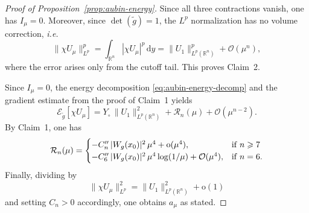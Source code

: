\documentclass[reqno,11pt]{amsart}
\numberwithin{equation}{section}
\theoremstyle{definition}
\theoremstyle{remark}
\newcommand{\ud}{\,\mathrm{d}}
\newcommand{\R}{\mathbb{R}}
\begin{document}
\begin{proof}[Proof of Proposition~\ref{prop:aubin-energy}]
Since all three contractions vanish, one has $I_\mu = 0$. Moreover, since $\det(\tilde{g}) = 1$, the $L^p$ normalization has no volume correction, {\it i.e.}
\[
\|\chi U_\mu\|_{L^p}^p = \int_{\R^n} |\chi U_\mu|^p \ud y = \|U_1\|_{L^p(\R^n)}^p + \mathcal{O}(\mu^n),
\]
where the error arises only from the cutoff tail. This proves Claim~2.

\medskip
Since $I_\mu = 0$, the energy decomposition \eqref{eq:aubin-energy-decomp} and the gradient estimate from the proof of Claim~1 yields
\[
\mathcal{E}_{\tilde{g}}[\chi U_\mu] = Y_\circ\,\|U_1\|_{L^p(\R^n)}^2 + \mathcal{R}_n(\mu) + \mathcal{O}(\mu^{n-2}).
\]
By Claim~1, one has
\[
\mathcal{R}_n(\mu)=
\begin{cases}
  -C_n''\,|W_g(x_0)|^2\,\mu^4 + \mathrm{o}(\mu^4), &{\rm if} \; n \geqslant 7\\
  -C_6''\,|W_g(x_0)|^2\,\mu^4\log(1/\mu) + \mathcal{O}(\mu^4), &{\rm if} \; n = 6.
\end{cases}
\]
Finally, dividing by
\[
\|\chi U_\mu\|_{L^p}^2 = \|U_1\|_{L^p(\R^n)}^2 + \mathrm{o}(1)
\]
and setting $C_n > 0$ accordingly, one obtains $a_\mu$ as stated.
\end{proof}
\end{document}
